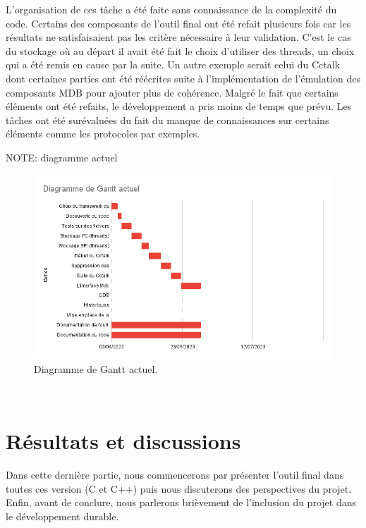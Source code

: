 \documentclass[a4paper]{article}
\begin{document}
L'organisation de ces tâche a été faite sans connaissance de la complexité du
code. Certains des composants de l'outil final ont été refait plusieurs fois car
les résultats ne satisfaisaient pas les critère nécessaire à leur validation.
C'est le cas du stockage où au départ il avait été fait le choix d'utiliser des
threads, un choix qui a été remis en cause par la suite. Un autre exemple serait
celui du Cctalk dont certaines parties ont été réécrites suite à
l'implémentation de l'émulation des composants MDB pour ajouter plus de
cohérence. Malgré le fait que certains éléments ont été refaits, le
développement a pris moins de temps que prévu. Les tâches ont été surévaluées du
fait du manque de connaissances sur certains éléments comme les protocoles par
exemples.

NOTE: diagramme actuel

\begin{figure}[h!]
  \begin{center}
  \includegraphics[scale=0.6]{./img/current-gantt.png}
  \caption{Diagramme de Gantt actuel.}
  \end{center}
\end{figure}~\\
\clearpage
\part{Résultats et discussions}

Dans cette dernière partie, nous commencerons par présenter l'outil final dans
toutes ces version (C et C++) puis nous discuterons des perspectives du projet.
Enfin, avant de conclure, nous parlerons brièvement de l'inclusion du projet
dans le développement durable.
\end{document}
